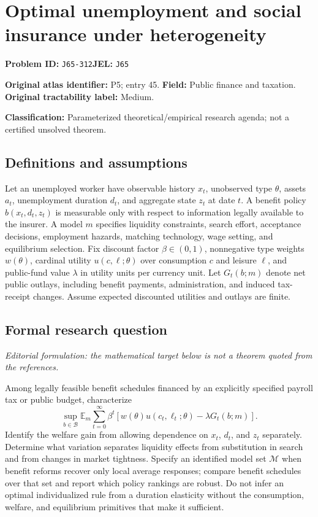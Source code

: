 \documentclass[11pt,a4paper]{article}
\begin{document}
\section*{Optimal unemployment and social insurance under heterogeneity}
\textbf{Problem ID:} \texttt{J65-312}\quad \textbf{JEL:} \texttt{J65}\par
\label{problem:OP-0045}
\label{atlas:prob:P5}
\noindent\textbf{Original atlas identifier:} P5; entry 45. \textbf{Field:} Public finance and taxation. \textbf{Original tractability label:} Medium.

\noindent\textbf{Classification:} Parameterized theoretical/empirical research agenda; not a certified unsolved theorem.

\subsection*{Definitions and assumptions}
Let an unemployed worker have observable history $x_t$, unobserved type $\theta$, assets $a_t$, unemployment duration $d_t$, and aggregate state $z_t$ at date $t$. A benefit policy $b(x_t,d_t,z_t)$ is measurable only with respect to information legally available to the insurer. A model $m$ specifies liquidity constraints, search effort, acceptance decisions, employment hazards, matching technology, wage setting, and equilibrium selection. Fix discount factor $\beta\in(0,1)$, nonnegative type weights $w(\theta)$, cardinal utility $u(c,\ell;\theta)$ over consumption $c$ and leisure $\ell$, and public-fund value $\lambda$ in utility units per currency unit. Let $G_t(b;m)$ denote net public outlays, including benefit payments, administration, and induced tax-receipt changes. Assume expected discounted utilities and outlays are finite.

\subsection*{Formal research question}
\emph{Editorial formulation: the mathematical target below is not a theorem quoted from the references.}

Among legally feasible benefit schedules financed by an explicitly specified payroll tax or public budget, characterize
\[
 \sup_{b\in\mathcal B}\mathbb E_m\sum_{t=0}^{\infty}\beta^t
 \left[w(\theta)u(c_t,\ell_t;\theta)-\lambda G_t(b;m)\right].
\]
Identify the welfare gain from allowing dependence on $x_t$, $d_t$, and $z_t$ separately. Determine what variation separates liquidity effects from substitution in search and from changes in market tightness. Specify an identified model set $\mathcal M$ when benefit reforms recover only local average responses; compare benefit schedules over that set and report which policy rankings are robust. Do not infer an optimal individualized rule from a duration elasticity without the consumption, welfare, and equilibrium primitives that make it sufficient.
\end{document}
